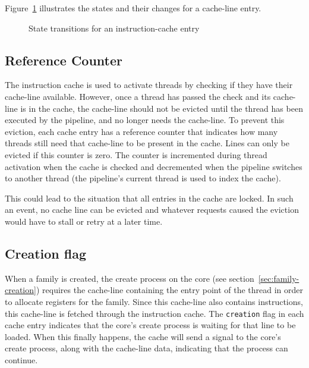 Figure~\ref{fig:icache-states} illustrates the states and their changes for a cache-line entry.

\begin{figure}
 \begin{center}
  
  \caption{State transitions for an instruction-cache entry}
  \label{fig:icache-states}
 \end{center}
\end{figure}

\subsection{Reference Counter}
\label{sec:icache-refcount}
The instruction cache is used to activate threads by checking if they have their cache-line available. However, once a thread has passed the check and its cache-line is in the cache, the cache-line should not be evicted until the thread has been executed by the pipeline, and no longer needs the cache-line. To prevent this eviction, each cache entry has a reference counter that indicates how many threads still need that cache-line to be present in the cache. Lines can only be evicted if this counter is zero. The counter is incremented during thread activation when the cache is checked and decremented when the pipeline switches to another thread (the pipeline's current thread is used to index the cache).

This could lead to the situation that all entries in the cache are locked. In such an event, no cache line can be evicted and whatever requests caused the eviction would have to stall or retry at a later time.

\subsection{Creation flag}
\label{sec:icache-creation-flag}
When a family is created, the create process on the core (see section~\ref{sec:family-creation}) requires the cache-line containing the entry point of the thread in order to allocate registers for the family. Since this cache-line also contains instructions, this cache-line is fetched through the instruction cache. The {\tt creation} flag in each cache entry indicates that the core's create process is waiting for that line to be loaded. When this finally happens, the cache will send a signal to the core's create process, along with the cache-line data, indicating that the process can continue.

